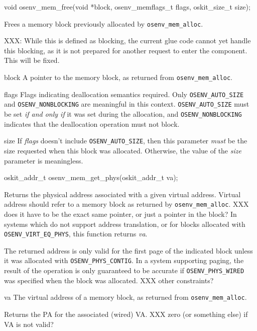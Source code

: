 \begin{apisyn}
        \funcproto void osenv_mem_free(void *block, osenv_memflags_t flags,
				      oskit_size_t size);
\end{apisyn}
\drvtoosb
\begin{apidesc}
	Frees a memory block previously allocated by {\tt osenv_mem_alloc}.

	XXX: While this is defined as blocking, the current glue
	code cannot yet handle this blocking, as it is not
	prepared for another request to enter the component.
	This will be fixed.

\end{apidesc}
\begin{apiparm}
	\item[block]
		A pointer to the memory block,
		as returned from {\tt osenv_mem_alloc}.
	\item[flags]
		Flags indicating deallocation semantics required.
		Only {\tt OSENV_AUTO_SIZE} and {\tt OSENV_NONBLOCKING}
		are meaningful in this context.
		{\tt OSENV_AUTO_SIZE} must be set
		\emph{if and only if} it was set during the allocation,
		and {\tt OSENV_NONBLOCKING} indicates
		that the deallocation operation must not block.
	\item[size]
		If \emph{flags} doesn't include {\tt OSENV_AUTO_SIZE},
		then this parameter \emph{must} be the size requested
		when this block was allocated.
		Otherwise, the value of the \emph{size} parameter is
		meaningless.
\end{apiparm}


\begin{apisyn}
	\funcproto oskit_addr_t osenv_mem_get_phys(oskit_addr_t va);
\end{apisyn}
\drvtoosn
\begin{apidesc}
	Returns the physical address associated with a given virtual address.
	Virtual address should refer to a memory block as returned by
	{\tt osenv_mem_alloc}.
		XXX does it have to be the exact same pointer,
		or just a pointer in the block?
	In systems which do not support address translation,
	or for blocks allocated with {\tt OSENV_VIRT_EQ_PHYS},
	this function returns \emph{va}.

	The returned address is only valid for the first page of the
	indicated block unless it was allocated with {\tt OSENV_PHYS_CONTIG}.
	In a system supporting paging,
	the result of the operation is only guaranteed to be accurate if
	{\tt OSENV_PHYS_WIRED} was specified when the block was allocated.
		XXX other constraints?
\end{apidesc}
\begin{apiparm}
	\item[va]
		The virtual address of a memory block,
		as returned from {\tt osenv_mem_alloc}.
\end{apiparm}
\begin{apiret}
	Returns the PA for the associated (wired) VA\@.
	XXX zero (or something else) if VA is not valid?
\end{apiret}


